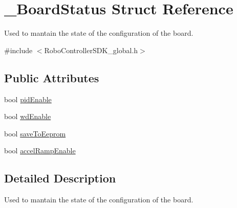 \hypertarget{struct___board_status}{\section{\-\_\-\-Board\-Status Struct Reference}
\label{struct___board_status}
}


Used to mantain the state of the configuration of the board.  




{\ttfamily \#include $<$Robo\-Controller\-S\-D\-K\-\_\-global.\-h$>$}

\subsection*{Public Attributes}
\begin{DoxyCompactItemize}
\item 
bool \hyperlink{struct___board_status_ab46b9c91875df3c2871962e1b5d7ac59}{pid\-Enable}
\item 
bool \hyperlink{struct___board_status_aacf5e62d8821a7ee164979f9f529a867}{wd\-Enable}
\item 
bool \hyperlink{struct___board_status_a30b34c999564107e05997c953d0fc31c}{save\-To\-Eeprom}
\item 
bool \hyperlink{struct___board_status_a950c73606e91c9302fde6d119f7e79a8}{accel\-Ramp\-Enable}
\end{DoxyCompactItemize}


\subsection{Detailed Description}
Used to mantain the state of the configuration of the board. 

